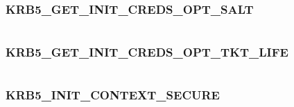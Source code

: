 \documentclass[letterpaper,10pt,english]{sphinxmanual}
\begin{document}
\subsubsection{KRB5\_GET\_INIT\_CREDS\_OPT\_SALT}
\label{appdev/refs/macros/KRB5_GET_INIT_CREDS_OPT_SALT:krb5-get-init-creds-opt-salt-data}\label{appdev/refs/macros/KRB5_GET_INIT_CREDS_OPT_SALT:krb5-get-init-creds-opt-salt}\label{appdev/refs/macros/KRB5_GET_INIT_CREDS_OPT_SALT::doc}

\begin{fulllineitems}
\label{appdev/refs/macros/KRB5_GET_INIT_CREDS_OPT_SALT:KRB5_GET_INIT_CREDS_OPT_SALT}
\end{fulllineitems}


\begin{tabulary}{\linewidth}{|L|L|}
\hline

 & 
\\\hline
\end{tabulary}



\subsubsection{KRB5\_GET\_INIT\_CREDS\_OPT\_TKT\_LIFE}
\label{appdev/refs/macros/KRB5_GET_INIT_CREDS_OPT_TKT_LIFE::doc}\label{appdev/refs/macros/KRB5_GET_INIT_CREDS_OPT_TKT_LIFE:krb5-get-init-creds-opt-tkt-life-data}\label{appdev/refs/macros/KRB5_GET_INIT_CREDS_OPT_TKT_LIFE:krb5-get-init-creds-opt-tkt-life}

\begin{fulllineitems}
\label{appdev/refs/macros/KRB5_GET_INIT_CREDS_OPT_TKT_LIFE:KRB5_GET_INIT_CREDS_OPT_TKT_LIFE}
\end{fulllineitems}


\begin{tabulary}{\linewidth}{|L|L|}
\hline

 & 
\\\hline
\end{tabulary}



\subsubsection{KRB5\_INIT\_CONTEXT\_SECURE}
\label{appdev/refs/macros/KRB5_INIT_CONTEXT_SECURE::doc}\label{appdev/refs/macros/KRB5_INIT_CONTEXT_SECURE:krb5-init-context-secure}\label{appdev/refs/macros/KRB5_INIT_CONTEXT_SECURE:krb5-init-context-secure-data}
\end{document}
